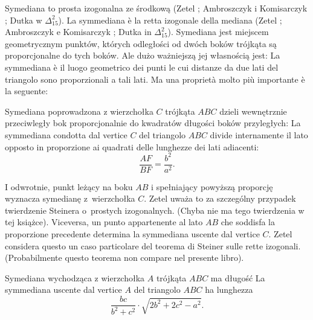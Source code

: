Symediana to prosta izogonalna ze środkową (Zetel \cite[s. 111]{zetel_2020}; Ambroszczyk i Komisarczyk \cite[s. 26]{komisarczyk_2024}; Dutka w $\Delta_{15}^2$). %
La symmediana è la retta izogonale della mediana (Zetel \cite[p. 111]{zetel_2020}; Ambroszczyk e Komisarczyk \cite[p. 26]{komisarczyk_2024}; Dutka in $\Delta_{15}^2$). %
Symediana jest miejscem geometrycznym punktów, których odległości od dwóch boków trójkąta są proporcjonalne do tych boków. %
Ale dużo ważniejszą jej własnością jest: %
La symmediana è il luogo geometrico dei punti le cui distanze da due lati del triangolo sono proporzionali a tali lati. %
Ma una proprietà molto più importante è la seguente: %

\begin{proposition}
    \label{random_prp_symmedians_proportional_squares}
    Symediana poprowadzona z wierzchołka $C$ trójkąta $ABC$ dzieli wewnętrznie przeciwległy bok proporcjonalnie do kwadratów długości boków przyległych: %
    La symmediana condotta dal vertice $C$ del triangolo $ABC$ divide internamente il lato opposto in proporzione ai quadrati delle lunghezze dei lati adiacenti: %
    \begin{equation}
        \frac{AF}{BF} = \frac{b^2}{a^2}.
    \end{equation}
\end{proposition}

I odwrotnie, punkt leżący na boku $AB$ i spełniający powyższą proporcję wyznacza symedianę z~wierzchołka $C$. %
Zetel \cite[s. 111, 112]{zetel_2020} uważa to za szczególny przypadek twierdzenie Steinera o~prostych izogonalnych. %
(Chyba nie ma tego twierdzenia w tej książce). %
Viceversa, un punto appartenente al lato $AB$ che soddisfa la proporzione precedente determina la symmediana uscente dal vertice $C$. %
Zetel \cite[p. 111, 112]{zetel_2020} considera questo un caso particolare del teorema di Steiner sulle rette izogonali. %
(Probabilmente questo teorema non compare nel presente libro). %

\begin{proposition}
    Symediana wychodząca z wierzchołka $A$ trójkąta $ABC$ ma długość %
    La symmediana uscente dal vertice $A$ del triangolo $ABC$ ha lunghezza %
    \begin{equation}
        \frac{bc}{b^2 + c^2} \cdot \sqrt {2b^2 + 2c^2 - a^2}.
    \end{equation}
\end{proposition}

